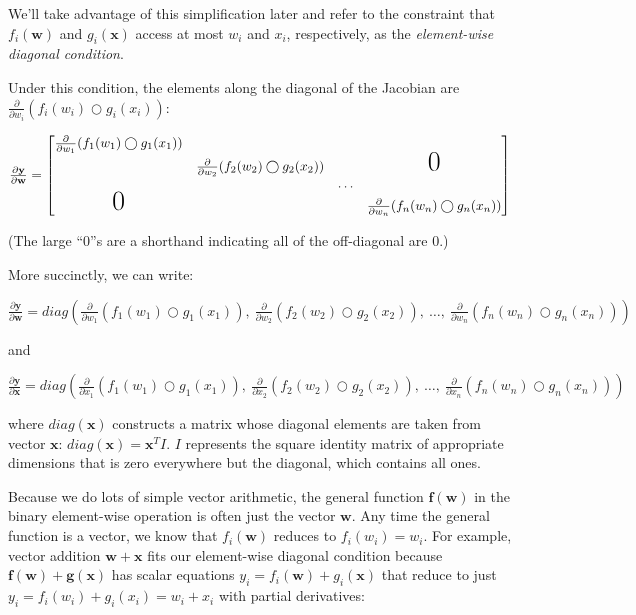 \documentclass[11pt]{article}
\begin{document}
We'll take advantage of this simplification later and refer to the constraint that $f_i(\mathbf{w})$ and $g_i(\mathbf{x})$ access at most $w_i$ and $x_i$, respectively, as the {\em element-wise diagonal condition}.

Under this condition, the elements along the diagonal of the Jacobian are $\frac{\partial}{\partial w_i} ( f_i(w_i) \bigcirc g_i(x_i) )$:

$
\frac{\partial \mathbf{y}}{\partial \mathbf{w}}  = \begin{bmatrix}
\frac{\partial}{\partial w_1} ( f_{1}(w_1) \bigcirc g_{1}(x_1) )\\
& \frac{\partial}{\partial w_2} (f_{2}(w_2) \bigcirc g_{2}(x_2) ) & &\text{\huge0}\\
& & \ldots \\
\text{\huge0}& & & \frac{\partial}{\partial w_n} (f_{n}(w_n) \bigcirc g_{n}(x_n) )
\end{bmatrix}
$

(The large ``0''s are a shorthand indicating all of the off-diagonal are 0.)

More succinctly, we can write:

$\frac{\partial \mathbf{y}}{\partial \mathbf{w}} = diag \left( \frac{\partial}{\partial w_1}(f_{1}(w_1) \bigcirc g_{1}(x_1)),~ \frac{\partial}{\partial w_2}(f_{2}(w_2) \bigcirc g_{2}(x_2)),~ \ldots,~ \frac{\partial}{\partial w_n}(f_{n}(w_n) \bigcirc g_{n}(x_n)) \right)$

and

$\frac{\partial \mathbf{y}}{\partial \mathbf{x}} = diag \left( \frac{\partial}{\partial x_1}(f_{1}(w_1) \bigcirc g_{1}(x_1)),~ \frac{\partial}{\partial x_2}(f_{2}(w_2) \bigcirc g_{2}(x_2)),~ \ldots,~ \frac{\partial}{\partial x_n}(f_{n}(w_n) \bigcirc g_{n}(x_n)) \right)$

where $diag(\mathbf{x})$ constructs a matrix whose diagonal elements are taken from vector $\mathbf{x}$: $diag(\mathbf{x}) = \mathbf{x}^T I$. $I$ represents the square identity matrix of appropriate dimensions that is zero everywhere but the diagonal, which contains all ones.

Because we do lots of simple vector arithmetic, the general function $\mathbf{f(w)}$ in the binary element-wise operation is often just the vector $\mathbf{w}$.  Any time the general function is a vector, we know that $f_i(\mathbf{w})$ reduces to $f_i(w_i) = w_i$. For example, vector addition $\mathbf{w + x}$ fits our element-wise diagonal condition because $\mathbf{f(w)} + \mathbf{g(x)}$ has scalar equations $y_i = f_i(\mathbf{w}) + g_i(\mathbf{x})$ that reduce to just $y_i = f_i(w_i) + g_i(x_i) = w_i + x_i$ with partial derivatives:
\end{document}
